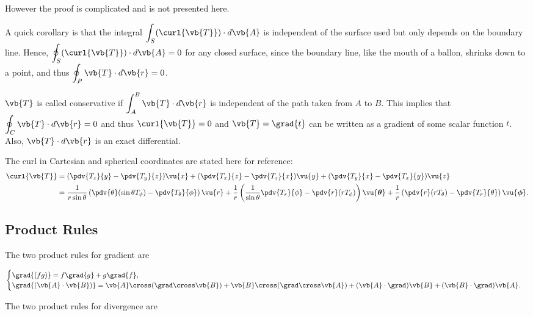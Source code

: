 \documentclass[english,a4paper,12pt]{report}
\begin{document}
However the proof is complicated and is not presented here.


A quick corollary is that the integral \(\displaystyle \int_{S} (\curl{\vb{T}}) \cdot d\vb{A}\) is independent of the surface used but only depends on the boundary line. Hence, \(\displaystyle \oint_{S} (\curl{\vb{T}}) \cdot d\vb{A} = 0\) for any closed surface, since the boundary line, like the mouth of a ballon, shrinks down to a point, and thus \(\displaystyle \oint_{P} \vb{T} \cdot d\vb{r} = 0\).

\(\vb{T} \) is called conservative if \(\displaystyle \int_{A}^{B}  \vb{T} \cdot d\vb{r}  \) is independent of the path taken from \(A\) to \(B\). This implies that \(\displaystyle \oint_{C} \vb{T} \cdot d\vb{r} = 0\) and thus \(\curl{\vb{T} } = 0\) and \(\vb{T} = \grad{t} \) can be written as a gradient of some scalar function \(t\). Also, \(\vb{T} \cdot d\vb{r} \) is an exact differential.      

The curl in Cartesian and spherical coordinates are stated here for reference:
\begin{equation} 
	\begin{aligned}
	\curl{\vb{T}} &= (\pdv{T_z}{y} - \pdv{T_y}{z})\vu{x} + (\pdv{T_x}{z} - \pdv{T_z}{x})\vu{y} + (\pdv{T_y}{x} - \pdv{T_x}{y})\vu{z} \\ &= \frac{1}{r\sin{\theta}}\left(\pdv{\theta}(\sin{\theta}T_{\phi}) - \pdv{T_{\theta}}{\phi}\right)\vu{r} + \frac{1}{r}\left(\frac{1}{\sin{\theta}}\pdv{T_r}{\phi} - \pdv{r}(rT_{\phi})\right)\vu{\boldsymbol{\theta } } + \frac{1}{r}\left(\pdv{r}(rT_{\theta}) - \pdv{T_r}{\theta}\right)\vu{\boldsymbol{\phi } }. 
    \end{aligned}
\end{equation}
	
\subsection{Product Rules}
The two product rules for gradient are

\begin{equation}
\begin{cases} 
	\grad{(fg)} = f\grad{g} + g\grad{f},  \\
	\grad{(\vb{A} \cdot \vb{B})} = \vb{A} \cross (\grad \cross \vb{B}) + \vb{B} \cross (\grad \cross \vb{A}) + (\vb{A} \cdot \grad)\vb{B} + (\vb{B} \cdot \grad)\vb{A}. 
\end{cases}
\end{equation}
	
The two product rules for divergence are 
\end{document}
